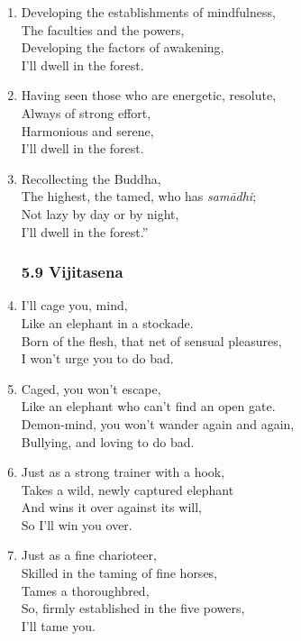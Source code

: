 \documentclass[10pt, openany]{book}
\begin{document}
\begin{enumerate}
\item Developing the establishments of mindfulness,\\
The faculties and the powers,\\
Developing the factors of awakening,\\
I’ll dwell in the forest.

\item Having seen those who are energetic, resolute,\\
Always of strong effort,\\
Harmonious and serene,\\
I’ll dwell in the forest.

\item Recollecting the Buddha,\\
The highest, the tamed, who has \emph{samādhi};\\
Not lazy by day or by night,\\
I’ll dwell in the forest.”

\subsubsection*{5.9 Vijitasena}

\item I’ll cage you, mind,\\
Like an elephant in a stockade.\\
Born of the flesh, that net of sensual pleasures,\\
I won’t urge you to do bad.

\item Caged, you won’t escape,\\
Like an elephant who can’t find an open gate.\\
Demon-mind, you won’t wander again and again,\\
Bullying, and loving to do bad.

\item Just as a strong trainer with a hook,\\
Takes a wild, newly captured elephant\\
And wins it over against its will,\\
So I’ll win you over.

\item Just as a fine charioteer, \\
Skilled in the taming  of fine horses, \\
Tames a thoroughbred,\\
So, firmly established in the five powers,\\
I’ll tame you.


\end{enumerate}
\end{document}
